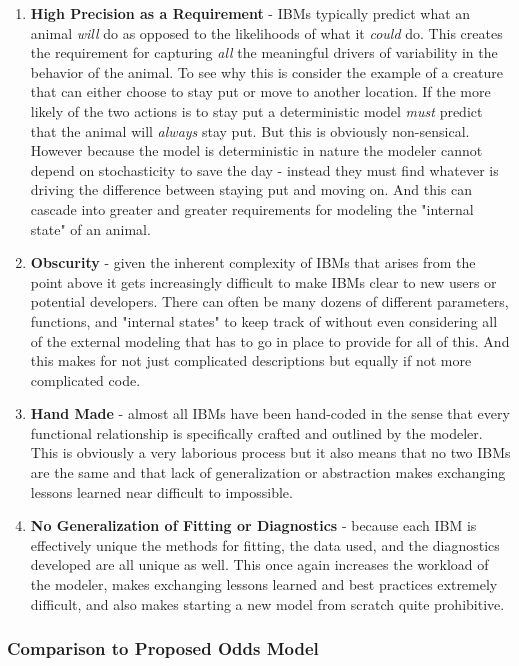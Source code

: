 \documentclass[11pt]{article}
\begin{document}
\begin{enumerate}
\item \textbf{High Precision as a Requirement} - IBMs typically predict what an animal \textit{will} do as opposed to the likelihoods of what it \textit{could} do. This creates the requirement for capturing \textit{all} the meaningful drivers of variability in the behavior of the animal. To see why this is consider the example of a creature that can either choose to stay put or move to another location. If the more likely of the two actions is to stay put a deterministic model \textit{must} predict that the animal will \textit{always} stay put. But this is obviously non-sensical. However because the model is deterministic in nature the modeler cannot depend on stochasticity to save the day - instead they must find whatever is driving the difference between staying put and moving on. And this can cascade into greater and greater requirements for modeling the "internal state" of an animal. 
\item \textbf{Obscurity} - given the inherent complexity of IBMs that arises from the point above it gets increasingly difficult to make IBMs clear to new users or potential developers. There can often be many dozens of different parameters, functions, and "internal states" to keep track of without even considering all of the external modeling that has to go in place to provide for all of this. And this makes for not just complicated descriptions but equally if not more complicated code.
\item \textbf{Hand Made} - almost all IBMs have been hand-coded in the sense that every functional relationship is specifically crafted and outlined by the modeler. This is obviously a very laborious process but it also means that no two IBMs are the same and that lack of generalization or abstraction makes exchanging lessons learned near difficult to impossible. 
\item \textbf{No Generalization of Fitting or Diagnostics} - because each IBM is effectively unique the methods for fitting, the data used, and the diagnostics developed are all unique as well. This once again increases the workload of the modeler, makes exchanging lessons learned and best practices extremely difficult, and also makes starting a new model from scratch quite prohibitive. 
\end{enumerate}

\subsubsection{Comparison to Proposed Odds Model}
\end{document}

